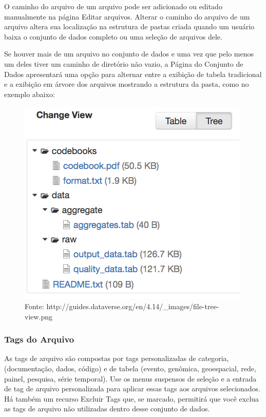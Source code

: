 \documentclass[12pt,hidelinks]{article}
\begin{document}
O caminho do arquivo de um arquivo pode ser adicionado ou editado manualmente na página Editar arquivos. Alterar o caminho do arquivo de um arquivo altera sua localização na estrutura de pastas criada quando um usuário baixa o conjunto de dados completo ou uma seleção de arquivos dele.

Se houver mais de um arquivo no conjunto de dados e uma vez que pelo menos um deles tiver um caminho de diretório não vazio, a Página do Conjunto de Dados apresentará uma opção para alternar entre a exibição de tabela tradicional e a exibição em árvore dos arquivos mostrando a estrutura da pasta, como no exemplo abaixo:

\begin{figure}[!htp]
                \centering
                \includegraphics[scale=0.5]{cam.png}
                \caption{Fonte: http://guides.dataverse.org/en/4.14/\_images/file-tree-view.png}
            \label{Caminho}
        \end{figure}
        
        \subsubsection{Tags do Arquivo}
        
\qquad As tags de arquivo são compostas por tags personalizadas de categoria, (documentação, dados, código) e de tabela (evento, genômica, geoespacial, rede, painel, pesquisa, série temporal). Use os menus suspensos de seleção e a entrada de tag de arquivo personalizada para aplicar essas tags aos arquivos selecionados. Há também um recurso Excluir Tags que, se marcado, permitirá que você exclua as tags de arquivo não utilizadas dentro desse conjunto de dados.
        
\end{document}
